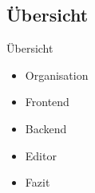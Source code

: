 \subsection{Übersicht}

\begin{frame}{Übersicht}
  \begin{itemize}
  	\pause
  	\item Organisation
  	\pause
  	\item Frontend
  	\pause
  	\item Backend
  	\pause
  	\item Editor
  	\pause
  	\item Fazit
  \end{itemize}
\end{frame}